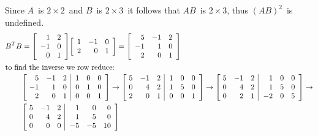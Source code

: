 \documentclass{letter}
\makeatletter
\newcommand{\?}{\stackrel{?}{=}}
\newcommand\Ans[2][]{%
   \leavevmode\noindent
   {
       \begin{mdframed}[backgroundcolor=blue!10]
       #2
       \end{mdframed}
   }
}
\newenvironment{Mat}[1]{%
  \left[\begin{array}{*{#1}{r}}
}{%
  \end{array}\right]
}
\newenvironment{Amat2}[1]{%
  \left[\begin{array}{@{~}*{#1}{r}| @{~~}*{#1}{r}}
}{%
  \end{array}\right]
}
\makeatother
\begin{document}
\begin{enumerate}
\begin{enumerate}[label=(\alph*)]
{    }
    \Ans{
        Since $A$\ is $2\times 2$\ and $B$\ is $2\times 3$\ it follows that $AB$\ is $2\times 3$, thus $(AB)^2$\ is undefined.  \\
        \begin{align*}
            B^TB &= \begin{Mat}{2} 1 & 2 \\ -1 & 0 \\ 0 & 1 \end{Mat}
                    \begin{Mat}{3} 1 & -1 & 0 \\  2 & 0 & 1 \end{Mat}
                  = \begin{Mat}{3} 5 & -1 & 2 \\ -1 & 1 & 0 \\ 2 & 0 & 1 \end{Mat} \\
                  \shortintertext{to find the inverse we row reduce:}
                    &\begin{Amat2}{3} 5 & -1 & 2 & 1 & 0 & 0 \\ 
                                     -1 &  1 & 0 & 0 & 1 & 0 \\ 
                                      2 &  0 & 1 & 0 & 0 & 1 \end{Amat2}
                  \to
                     \begin{Amat2}{3} 5 & -1 & 2 & 1 & 0 & 0 \\ 
                                      0 &  4 & 2 & 1 & 5 & 0 \\ 
                                      2 &  0 & 1 & 0 & 0 & 1 \end{Amat2}
                  \to
                     \begin{Amat2}{3} 5 & -1 & 2 &  1 & 0 & 0 \\
                                      0 &  4 & 2 &  1 & 5 & 0 \\
                                      0 &  2 & 1 & -2 & 0 & 5 \end{Amat2} 
                  \to\\
                  &  \begin{Amat2}{3} 5 & -1 & 2 &  1 &  0 &  0 \\
                                      0 &  4 & 2 &  1 &  5 &  0 \\
                                      0 &  0 & 0 & -5 & -5 & 10 \end{Amat2}
        \end{align*}
}
\end{enumerate}
\end{enumerate}
\end{document}
